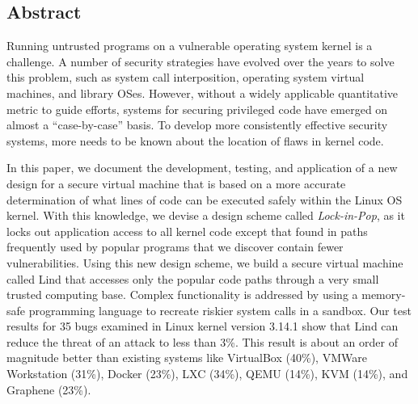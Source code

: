 \subsection*{Abstract}

Running untrusted programs on a vulnerable operating system kernel is a challenge.
A number of security strategies have evolved over the years to solve this problem,
such as system call interposition, operating system virtual machines, and library OSes.
However, without a widely applicable quantitative metric to guide efforts, systems
for securing privileged code
have emerged on almost a ``case-by-case'' basis. To develop more consistently
effective security systems,
more needs to be known about the location of flaws in kernel code.

In this paper, we document the development, testing, and application of a new
design for a secure virtual machine
that is based on a more accurate determination of what lines of code can be
executed safely within the Linux OS kernel.
With this knowledge, we devise a design scheme called \emph{Lock-in-Pop},
as it locks out application access to all kernel code
except that found in paths frequently used by popular programs that we discover
contain fewer vulnerabilities.
Using this new design scheme, we build a secure virtual machine called Lind that accesses only
the popular code paths through a very small trusted computing base. Complex functionality is addressed
by using a memory-safe programming language to recreate riskier system calls in a sandbox.
Our test results for 35 bugs examined in Linux kernel version 3.14.1 show that Lind can
reduce the threat of an attack to less than 3\%.
This result is about an order of magnitude better than existing systems like VirtualBox (40\%), VMWare Workstation (31\%), Docker (23\%),
LXC (34\%), QEMU (14\%), KVM (14\%), and Graphene (23\%).